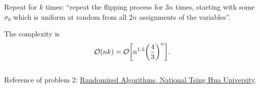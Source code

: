 \documentclass{article}
\begin{document}
Repeat for $k$ times: ``repeat the flipping process for $3n$ times, starting with some $\sigma_0$ which is uniform at random from all $2n$ assignments of the variables''.

The complexity is \[\mathcal{O}(nk)=\mathcal{O}\qty[n^{1.5}\qty(\frac{4}{3})^n].\]
\\[5pt]
Reference of problem 2: \href{http://www.cs.nthu.edu.tw/~wkhon/random12/lecture/lecture22.pdf}{Randomized Algorithms, National Tsing Hua University}.
\end{document}
